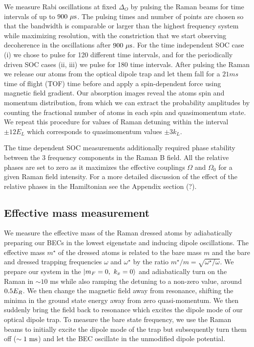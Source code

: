 We measure Rabi oscillations at fixed $\Delta_O$ by pulsing the Raman beams for time intervals of up to $900{\ \mu{\rm s}}$. The pulsing times and number of points are chosen so that the bandwidth is comparable or larger than the highest frequency system while maximizing resolution, with the constriction that we start observing decoherence in the oscillations after $900{\ \mu{\rm s}}$. For the time independent SOC case (i) we chose to pulse for 120 different time intervals, and for the periodically driven SOC cases (ii, iii) we pulse for 180 time intervals. After pulsing the Raman we release our atoms from the optical dipole trap and let them fall for a $21 ms$ time of flight (TOF) time before and apply a spin-dependent force using magnetic field gradient. Our absorption images reveal the atoms spin and momentum distribution, from which we can extract the probability amplitudes by counting the fractional number of atoms in each spin and quasimomentum state. We repeat this procedure for values of Raman detuning within the interval $\pm 12 E_L$ which corresponds to quasimomentum values $\pm 3k_L$.

The time dependent SOC measurements additionally required phase stability between the 3 frequency components in the Raman B field. All the relative phases are set to zero as it maximizes the effective couplings $\Omega$ and $\Omega_0$ for a given Raman field intensity. For a more detailed discussion of the effect of the relative phases in the Hamiltonian see the Appendix section (?). 

\subsection{Effective mass measurement}

We measure the effective mass of the Raman dressed atoms by adiabatically preparing our BECs in the lowest eigenstate and inducing dipole oscillations. The effective mass $m^{\star}$ of the dressed atoms  is related to the bare mass $m$ and the bare and dressed trapping frequencies $\omega$ and $\omega^{\star}$ by the ratio $m^{\star}/m=\sqrt{\omega^{\star}/\omega}$. We prepare our system in the  $\ket{m_F=0,\ k_x=0}$ and adiabatically turn on the Raman in $\sim10$ ms while also ramping the detuning to a non-zero value, around $0.5{{E_R}}$.  We then change the magnetic field away from resonance, shifting the minima in the ground state energy away from zero quasi-momentum. We then suddenly bring the field back to resonance which excites the dipole mode of our optical dipole trap. To measure the bare state frequency, we use the Raman beams to initially excite the dipole mode of the trap but subsequently turn them off ($\sim1{\ {\rm ms}}$) and let the BEC oscillate in the unmodified dipole potential. 

